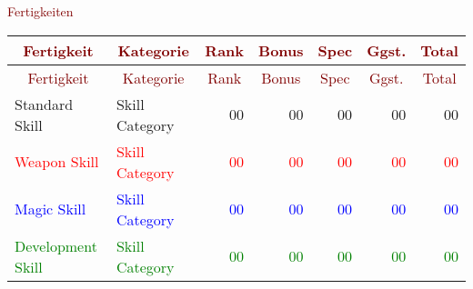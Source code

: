 \begin{center}
\textcolor{Maroon}{\Large Fertigkeiten}

\begin{longtable}{p{5cm}p{5cm}rrrrr}

\multicolumn{1}{c}{\textcolor{Maroon}{Fertigkeit}} & \multicolumn{1}{c}{\textcolor{Maroon}{Kategorie}} & \multicolumn{1}{c}{\textcolor{Maroon}{Rank}} & \multicolumn{1}{c}{\textcolor{Maroon}{Bonus}} & \multicolumn{1}{c}{\textcolor{Maroon}{Spec}} & \multicolumn{1}{c}{\textcolor{Maroon}{Ggst.}} & \multicolumn{1}{c}{\textcolor{Maroon}{Total}} \\ \hline 
\endfirsthead

\multicolumn{1}{c}{\textcolor{Maroon}{Fertigkeit}} & \multicolumn{1}{c}{\textcolor{Maroon}{Kategorie}} & \multicolumn{1}{c}{\textcolor{Maroon}{Rank}} & \multicolumn{1}{c}{\textcolor{Maroon}{Bonus}} & \multicolumn{1}{c}{\textcolor{Maroon}{Spec}} & \multicolumn{1}{c}{\textcolor{Maroon}{Ggst.}} & \multicolumn{1}{c}{\textcolor{Maroon}{Total}} \\
\hline 
\endhead

\endfoot

\endlastfoot
Standard Skill & Skill Category & 00 & 00 & 00 & 00 & 00 \\
\textcolor{Red}{Weapon Skill} & \textcolor{Red}{Skill Category} & \textcolor{Red}{00} & \textcolor{Red}{00} & \textcolor{Red}{00} & \textcolor{Red}{00} &\textcolor{Red}{00} \\
\textcolor{Blue}{Magic Skill} & \textcolor{Blue}{Skill Category} & \textcolor{Blue}{00} & \textcolor{Blue}{00} & \textcolor{Blue}{00} & \textcolor{Blue}{00} &\textcolor{Blue}{00} \\
\textcolor{Green}{Development Skill} & \textcolor{Green}{Skill Category} & \textcolor{Green}{00} & \textcolor{Green}{00} & \textcolor{Green}{00} & \textcolor{Green}{00} &\textcolor{Green}{00} \\
\end{longtable}
\end{center}
